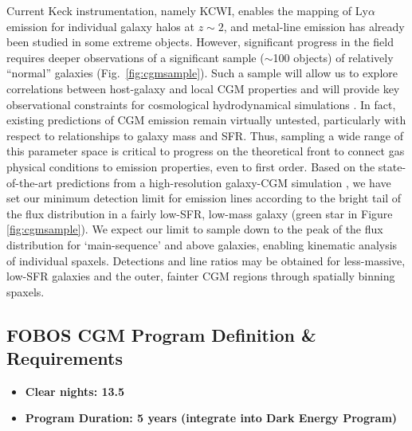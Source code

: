\documentclass[11pt,a4paper,twoside,onecolumn,openany,final,oldfontcommands]{memoir}
\begin{document}
Current Keck instrumentation, namely KCWI, enables the mapping of Ly$\alpha$ emission for individual galaxy halos at $z\sim2$, and metal-line emission has already been studied in some extreme objects. However, significant progress in the field requires deeper observations of a significant sample ($\sim$100 objects) of relatively ``normal'' galaxies (Fig.~\ref{fig:cgmsample}).  Such a sample will allow us to explore correlations between host-galaxy and local CGM properties and will provide key observational constraints for cosmological hydrodynamical simulations \citep{Nelson:2019_outflows,Oppenheimer:2018aa}.  In fact, existing predictions of CGM emission remain virtually untested, particularly with respect to relationships to galaxy mass and SFR.  Thus, sampling a wide range of this parameter space is critical to progress on the theoretical front to connect gas physical conditions to emission properties, even to first order.  Based on the state-of-the-art predictions from a high-resolution galaxy-CGM simulation \citep{Corlies:2018aa}, we have set our minimum detection limit for emission lines according to the bright tail of the flux distribution in a fairly low-SFR, low-mass galaxy (green star in Figure \ref{fig:cgmsample}).  We expect our limit to sample down to the peak of the flux distribution for `main-sequence' and above galaxies, enabling kinematic analysis of individual spaxels.  Detections and line ratios may be obtained for less-massive, low-SFR galaxies and the outer, fainter CGM regions through spatially binning spaxels.


\subsection{FOBOS CGM Program Definition \& Requirements}

\medskip
\begin{itemize}[leftmargin=0.3in, itemsep=0pt]
	\item[] \textbf{Clear nights: 13.5}
	\item[] \textbf{Program Duration: 5 years (integrate into Dark Energy Program)}
\end{itemize}
\end{document}
